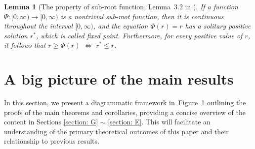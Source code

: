 \documentclass{article}
\newtheorem{lemma}{Lemma}
\begin{document}
\begin{lemma}[The property of sub-root function, Lemma~3.2 in \cite{Bartlett_2005}] 
\label{lemma:sub-root pro} 
If a function \( \Psi : [0, \infty) \rightarrow [0, \infty) \) is a nontrivial sub-root function,
then it is continuous throughout the interval \( [0, \infty) \), and the equation \( \Phi(r) = r \) has a solitary positive solution $r^*$, which is called fixed point. 
Furthermore, for every positive value of \( r \), it follows that \( r \geq \Phi(r) \) $\Longleftrightarrow$ \( r^* \leq r \). 
\end{lemma}

\section{A big picture of the main results} 
\label{sec-app:big_picture}


In this section, we present a diagrammatic framework in~Figure~\ref{fig:theorem proof} outlining the proofs of the main theorems and corollaries, providing a concise overview of the content in Sections \ref{section: G} $\sim$ \ref{section: E}. This will facilitate an understanding of the primary theoretical outcomes of this paper and their relationship to previous results.


\begin{figure}[omitted: a diagram of this paper's results, not reproduced here]\label{fig:theorem proof}\end{figure}
\end{document}
